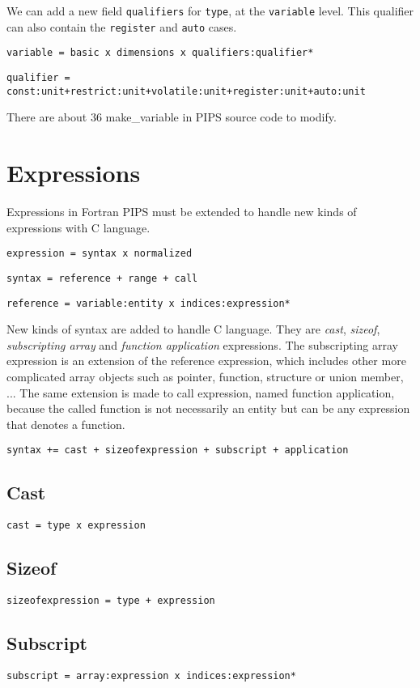 \documentclass[a4paper]{article}
\begin{document}
We can add a new field \verb/qualifiers/ for \verb/type/, at the
\verb/variable/ level. This qualifier can also contain the \verb/register/
and \verb/auto/ cases.

\verb/variable = basic x dimensions x qualifiers:qualifier*/

\verb/qualifier = const:unit+restrict:unit+volatile:unit+register:unit+auto:unit/

There are about 36 make\_variable in PIPS source code to modify.

\newpage
\section{Expressions}

Expressions in Fortran PIPS must be extended to handle new kinds of
expressions with C language.

\verb/expression = syntax x normalized/

\verb/syntax = reference + range + call/

\verb/reference = variable:entity x indices:expression*/

New kinds of syntax are added to handle C language. They are {\it cast},
 {\it sizeof}, {\it subscripting array} and
{\it function application} expressions. The subscripting array expression
is an extension of the reference expression, which includes other
more complicated array objects such as pointer, function, 
structure or union member, ... The same extension is made to call
expression, named function application, because the called function is
not necessarily an entity but can be any expression that denotes a function.   

\verb/syntax += cast + sizeofexpression + subscript + application/

\subsection{Cast}
\verb/cast = type x expression/

\subsection{Sizeof}
\verb/sizeofexpression = type + expression/

\subsection{Subscript}
\verb/subscript = array:expression x indices:expression*/
\end{document}
